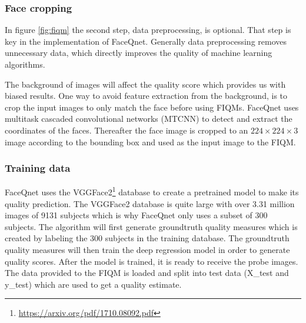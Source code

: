 \subsubsection*{Face cropping}
In figure \ref{fig:fiqm} the second step, data preprocessing, is optional. That step is key in the implementation of FaceQnet. Generally data preprocessing removes unnecessary data, which directly improves the quality of machine learning algorithms. 

The background of images will affect the quality score which provides us with biased results. One way to avoid feature extraction from the background, is to crop the input images to only match the face before using FIQMs. FaceQnet uses multitask cascaded convolutional networks (MTCNN) to detect and extract the coordinates of the faces. Thereafter the face image is cropped to an $224 \times 224 \times 3$ image according to the bounding box and used as the input image to the FIQM. 
\newpage

\subsubsection*{Training data}
FaceQnet uses the VGGFace2\footnote{\url{https://arxiv.org/pdf/1710.08092.pdf}} database to create a pretrained model to make its quality prediction. The VGGFace2 database is quite large with over 3.31 million images of 9131 subjects which is why FaceQnet only uses a subset of 300 subjects. The algorithm will first generate groundtruth quality measures which is created by labeling the 300 subjects in the training database. The groundtruth quality measures will then train the deep regression model in order to generate quality scores. After the model is trained, it is ready to receive the probe images. The data provided to the FIQM is loaded and split into test data (X\_test and y\_test) which are used to get a quality estimate. 

